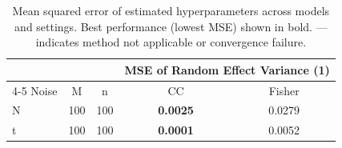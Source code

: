 
\begin{table}[htbp]
\centering
\begin{tabular}{lcccc}
\toprule
\multicolumn{3}{c}{} & \multicolumn{2}{c}{MSE of Random Effect Variance (1)} \\
\cmidrule(lr){4-5}
Noise & M & n & \multicolumn{1}{c}{CC} & \multicolumn{1}{c}{Fisher} \\
\midrule
N & 100 & 100 & \textbf{0.0025} & 0.0279 \\
t & 100 & 100 & \textbf{0.0001} & 0.0052 \\

\bottomrule
\end{tabular}
\caption{{Mean squared error of estimated hyperparameters across models and settings. Best performance (lowest MSE) shown in bold. --- indicates method not applicable or convergence failure.}}
\label{{tab:hyperparams_mse}}
\end{table}